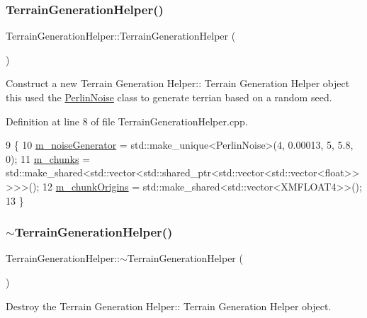 \subsubsection{\texorpdfstring{Terrain\+Generation\+Helper()}{TerrainGenerationHelper()}}
{\footnotesize\ttfamily Terrain\+Generation\+Helper\+::\+Terrain\+Generation\+Helper (\begin{DoxyParamCaption}{ }\end{DoxyParamCaption})}



Construct a new Terrain Generation Helper\+:\+: Terrain Generation Helper object this used the \mbox{\hyperlink{class_perlin_noise}{Perlin\+Noise}} class to generate terrian based on a random seed. 



Definition at line 8 of file Terrain\+Generation\+Helper.\+cpp.


\begin{DoxyCode}
9 \{
10     \mbox{\hyperlink{class_terrain_generation_helper_a2c9870bfe0dbf1a87a864562f28adc20}{m\_noiseGenerator}} = std::make\_unique<PerlinNoise>(4, 0.00013, 5, 5.8, 0);
11     \mbox{\hyperlink{class_terrain_generation_helper_ab5a4b915382e685454f5fe7f6081bc08}{m\_chunks}} = std::make\_shared<std::vector<std::shared\_ptr<std::vector<std::vector<float>>>>>();
12     \mbox{\hyperlink{class_terrain_generation_helper_a54b02e81523e592c5f36646731cd5a68}{m\_chunkOrigins}} = std::make\_shared<std::vector<XMFLOAT4>>();
13 \}
\end{DoxyCode}
\mbox{\label{class_terrain_generation_helper_ae0a170d1d0fa0615f143ca6700bf1c27}} 
\subsubsection{\texorpdfstring{$\sim$\+Terrain\+Generation\+Helper()}{~TerrainGenerationHelper()}}
{\footnotesize\ttfamily Terrain\+Generation\+Helper\+::$\sim$\+Terrain\+Generation\+Helper (\begin{DoxyParamCaption}{ }\end{DoxyParamCaption})}



Destroy the Terrain Generation Helper\+:\+: Terrain Generation Helper object. 



